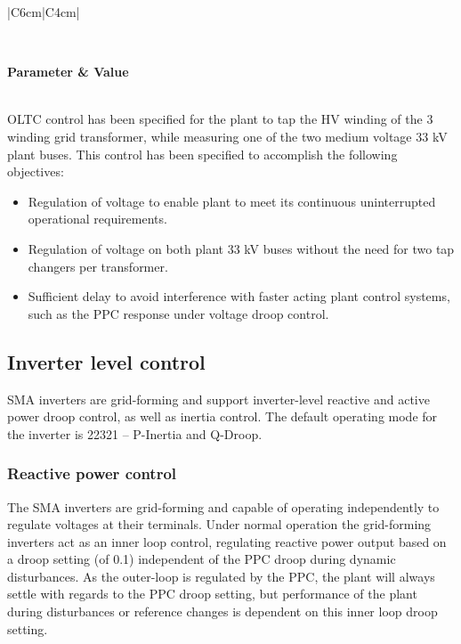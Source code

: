 \documentclass{../grid-link-report}
\begin{document}
	{
		\thicktablelines
		\begin{longtable}{|C{6cm}|C{4cm}|} 
			\caption{Grid transformer OLTC Details}
			\label{tab:main-transformer}
			\\	
			\toprule
			
			\bfseries \color{white}Parameter & \bfseries \color{white}Value\\
			\endhead
			\bottomrule \endfoot
			\\\hline
		\end{longtable}
	}

	
	OLTC control has been specified for the plant to tap the HV winding of the 3 winding grid transformer, while measuring one of the two medium voltage 33 kV plant buses. This control has been specified to accomplish the following objectives:
	
	\begin{itemize}
		\item Regulation of voltage to enable plant to meet its continuous uninterrupted operational requirements. 
		\item Regulation of voltage on both plant 33 kV buses without the need for two tap changers per transformer.
		\item Sufficient delay to avoid interference with faster acting plant control systems, such as the PPC response under voltage droop control.
	\end{itemize}
	
	\subsection{Inverter level control}
	\label{sec:inverter-level-control}
	SMA inverters are grid-forming and support inverter-level reactive and active power droop control, as well as inertia control. The default operating mode for the inverter is 22321 – P-Inertia and Q-Droop.
	
	\subsubsection{Reactive power control}
	
	The SMA inverters are grid-forming and capable of operating independently to regulate voltages at their terminals. Under normal operation the grid-forming inverters act as an inner loop control, regulating reactive power output based on a droop setting (of 0.1) independent of the PPC droop during dynamic disturbances. As the outer-loop is regulated by the PPC, the plant will always settle with regards to the PPC droop setting, but performance of the plant during disturbances or reference changes is dependent on this inner loop droop setting.
	
\end{document}
